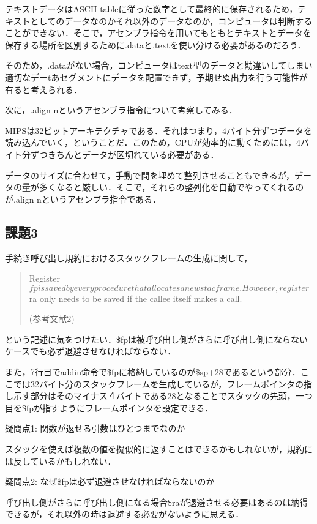 \documentclass[a4j]{jarticle}
\begin{document}
テキストデータはASCII tableに従った数字として最終的に保存されるため，テキストとしてのデータなのかそれ以外のデータなのか，コンピュータは判断することができない．そこで，アセンブラ指令を用いてもともとテキストとデータを保存する場所を区別するために.dataと.textを使い分ける必要があるのだろう．

そのため，.dataがない場合，コンピュータはtext型のデータと勘違いしてしまい適切なデーtあセグメントにデータを配置できず，予期せぬ出力を行う可能性が有ると考えられる．

次に，.align nというアセンブラ指令について考察してみる．

MIPSは32ビットアーキテクチャである．それはつまり，4バイト分ずつデータを読み込んでいく，ということだ．このため，CPUが効率的に動くためには，4バイト分ずつきちんとデータが区切れている必要がある．

データのサイズに合わせて，手動で間を埋めて整列させることもできるが，データの量が多くなると厳しい．そこで，それらの整列化を自動でやってくれるのが.align nというアセンブラ指令である．


\subsection{課題3}

手続き呼び出し規約におけるスタックフレームの生成に関して，

\begin{quote}
Register $fp is saved by every procedure that allocates a new stac frame. However, register $ra only needs to be saved if the callee itself makes a call.

(参考文献2)
\end{quote}

という記述に気をつけたい．\$fpは被呼び出し側がさらに呼び出し側にならないケースでも必ず退避させなければならない．

また，7行目でaddiu命令で\$fpに格納しているのが\$sp+28であるという部分．ここでは32バイト分のスタックフレームを生成しているが，フレームポインタの指し示す部分はそのマイナス４バイトである28となることでスタックの先頭，一つ目を\$fpが指すようにフレームポインタを設定できる．  


疑問点1: 関数が返せる引数はひとつまでなのか

スタックを使えば複数の値を擬似的に返すことはできるかもしれないが，規約には反しているかもしれない．

疑問点2:  なぜ\$fpは必ず退避させなければならないのか

呼び出し側がさらに呼び出し側になる場合\$raが退避させる必要はあるのは納得できるが，それ以外の時は退避する必要がないように思える．
\end{document}
